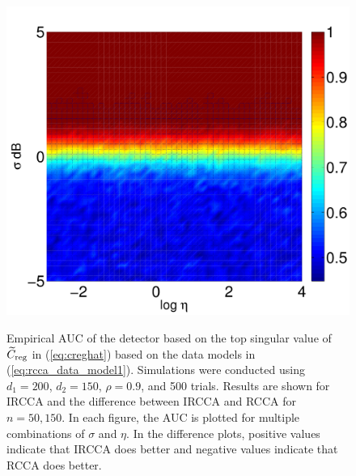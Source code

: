 \begin{figure}[h!]
{\includegraphics[width=\figwidth]{figures/ircca_auc_heatmap_n_150.pdf} 
} 
\caption{Empirical AUC of the detector based on the top singular value of $\widetilde{C}_{\text{reg}}$ in
  (\ref{eq:creghat}) based on the data models in (\ref{eq:rcca_data_model1}). Simulations
  were conducted using $d_1=200$, $d_2=150$, $\rho=0.9$, and 500 trials. Results are shown
  for IRCCA and the difference between IRCCA and RCCA for $n=50,150$. In each figure, the
  AUC is plotted for multiple combinations of $\sigma$ and $\eta$. In the difference
  plots, positive values indicate that IRCCA does better and negative values indicate that
  RCCA does better.}
\label{fig:ircca_auc_heatmap1}
\end{figure}


